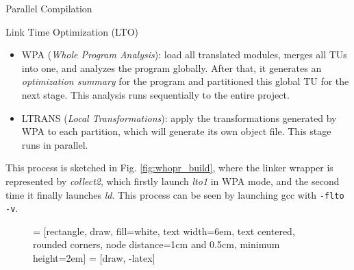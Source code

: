 \begin{section}{Parallel Compilation}
\begin{subsection}{Link Time Optimization (LTO)}
\begin{itemize}
\item WPA (\textit{Whole Program Analysis}): load all translated modules,
merges all TUs into one, and analyzes the program globally. After that, it
generates an \emph{optimization summary} for the program and partitioned this
global TU for the next stage. This analysis runs sequentially to the entire
project.

\item LTRANS (\textit{Local Transformations}): apply the transformations generated by
WPA to each partition, which will generate its own object file. This stage runs in
parallel.
\end{itemize}

This process is sketched in Fig. \ref{fig:whopr_build}, where the linker
wrapper is represented by \textit{collect2}, which firstly launch \textit{lto1}
in WPA mode, and the second time it finally launches \textit{ld}. This process
can be seen by launching gcc with \texttt{-flto -v}.

\begin{figure}
 = [rectangle, draw, fill=white,
    text width=6em, text centered, rounded corners, node distance=1cm and 0.5cm, minimum height=2em]
 = [draw, -latex]
\end{figure}
\end{subsection}
\end{section}
